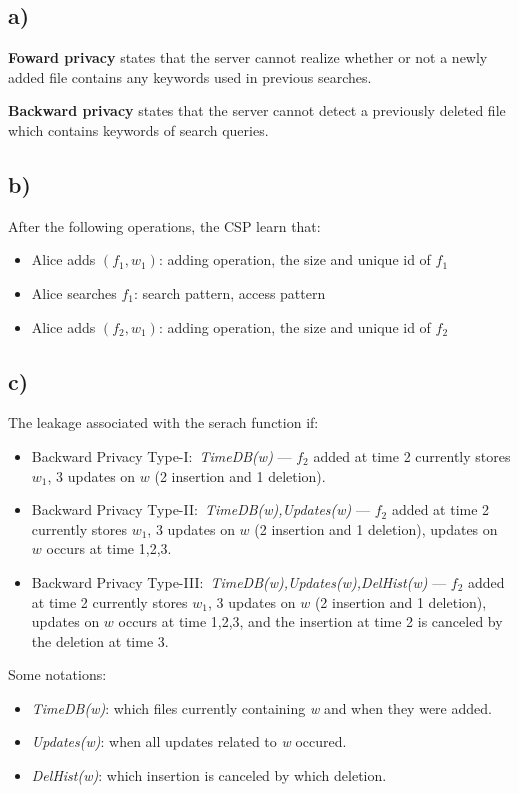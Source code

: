\subsection*{a)}
%
\textbf{Foward privacy} states that the server cannot realize whether or not a newly added
file contains any keywords used in previous searches.

\textbf{Backward privacy} states that the server cannot detect a previously deleted file
which contains keywords of search queries.

\subsection*{b)}
%
After the following operations, the CSP learn that:
\begin{itemize}
    \item Alice adds \((f_1,w_1)\): adding operation, the size and unique id of \(f_1\)
    \item Alice searches \(f_1\): search pattern, access pattern
    \item Alice adds \((f_2,w_1)\): adding operation, the size and unique id of \(f_2\)
\end{itemize}

\subsection*{c)}
%
The leakage associated with the serach function if:
\begin{itemize}
    \item Backward Privacy Type-I:\ \emph{TimeDB(w)} --- \(f_2\) added at time 2 currently
    stores \(w_1\), 3 updates on \(w\) (2 insertion and 1 deletion).
    \item Backward Privacy Type-II:\ \emph{TimeDB(w),Updates(w)} --- \(f_2\) added at time 2
    currently stores \(w_1\), 3 updates on \(w\) (2 insertion and 1 deletion), updates on
    \(w\) occurs at time 1,2,3.
    \item Backward Privacy Type-III:\ \emph{TimeDB(w),Updates(w),DelHist(w)} --- \(f_2\)
    added at time 2 currently stores \(w_1\), 3 updates on \(w\) (2 insertion and 1 deletion),
    updates on \(w\) occurs at time 1,2,3, and the insertion at time 2 is canceled by the
    deletion at time 3.
\end{itemize}

Some notations:
\begin{itemize}
    \item \emph{TimeDB(w)}: which files currently containing
    \emph{w} and when they were added.
    \item \emph{Updates(w)}: when all updates related to \emph{w} occured.
    \item \emph{DelHist(w)}: which insertion is canceled by
    which deletion.
\end{itemize}